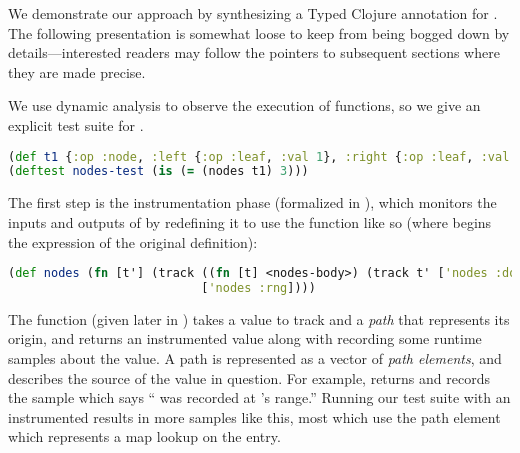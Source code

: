 \label{infer:sec:overview}

%

We demonstrate our approach by synthesizing a Typed Clojure annotation for .
The following presentation is somewhat loose to keep from being bogged down by details---interested
readers may follow the pointers to subsequent sections where they are made precise.

We use dynamic analysis to observe the execution of functions, so we give an
explicit test suite for .

\begin{lstlisting}[language=Clojure]
(def t1 {:op :node, :left {:op :leaf, :val 1}, :right {:op :leaf, :val 2}})
(deftest nodes-test (is (= (nodes t1) 3)))
\end{lstlisting}

The first step is the instrumentation phase
(formalized in ), which 
monitors the inputs and outputs of 
by redefining it to use the  function like so (where  begins the  expression of
the original  definition):

\begin{lstlisting}[language=Clojure]
(def nodes (fn [t'] (track ((fn [t] <nodes-body>) (track t' ['nodes :dom]))
                           ['nodes :rng])))
\end{lstlisting}

The  function (given later in )
takes a value to track and a
\emph{path} that represents its origin, and returns an instrumented value
along with recording some runtime samples about the value.
A path is represented as a vector of \emph{path elements},
and describes the source of the value in question.
For example, 
returns  and records the sample
which says `` was recorded at 's range.''
%
Running our test suite  with an instrumented 
results in more samples like this, most which use the path element
 which represents a map lookup on the  entry.

